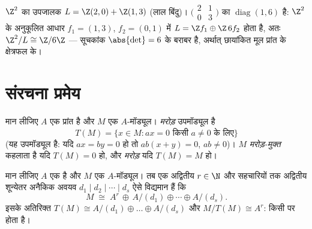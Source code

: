\begin{omfigure}

{\small $\Z^2$ का उपजालक $L = \Z(2,0) + \Z(1,3)$ (लाल बिंदु)। $\bigl(\begin{smallmatrix} 2 &
1\\ 0 & 3\end{smallmatrix}\bigr)$ का  $\operatorname{diag}(1, 6)$ है: $\Z^2$ के अनुकूलित आधार $f_1 = (1,3)$, $f_2 = (0,1)$ में
$L = \Z f_1 \oplus \Z\,6f_2$ होता है, अतः $\Z^2/L \cong \Z/6\Z$ --- सूचकांक $\abs{\det} = 6$ के बराबर है, अर्थात्
छायांकित मूल प्रांत के क्षेत्रफल के।}
\end{omfigure}

\section{संरचना प्रमेय}

\begin{definition}\label{def:b3:modules:torsion}
मान लीजिए $A$ एक प्रांत है और $M$ एक $A$-मॉड्यूल।
\emph{मरोड़} उपमॉड्यूल है
\[
T(M) = \{x \in M : ax = 0 \text{ किसी } a \neq 0 \text{ के लिए}\}
\]
(यह उपमॉड्यूल है: यदि $ax = by = 0$ हो तो $ab(x + y) = 0$, $ab \ne 0$)। $M$
\emph{मरोड़-मुक्त} कहलाता है यदि $T(M) = 0$ हो, और \emph{मरोड़
} यदि $T(M) = M$ हो।
\end{definition}

\begin{theorem}\label{thm:b3:modules:structure}
मान लीजिए $A$ एक  है और $M$ एक 
$A$-मॉड्यूल। तब एक अद्वितीय $r \in \N$ और सहचारियों तक अद्वितीय
शून्येतर अनैकिक अवयव $d_1 \mid d_2 \mid
\cdots \mid d_s$ ऐसे विद्यमान हैं
कि
\[
M \;\cong\; A^r \,\oplus\, A/(d_1) \oplus \cdots \oplus A/(d_s).
\]
इसके अतिरिक्त $T(M) \cong A/(d_1)\oplus\dots\oplus A/(d_s)$ और $M/T(M)
\cong A^r$: किसी  पर 
\emph{}   होता है।
\end{theorem}

